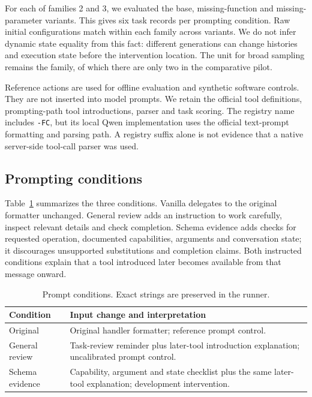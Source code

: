\documentclass[conference]{IEEEtran}
\newcommand{\code}[1]{\texttt{#1}}
\begin{document}
For each of families 2 and 3, we evaluated the base, missing-function and missing-parameter variants. This gives six task records per prompting condition. Raw initial configurations match within each family across variants. We do not infer dynamic state equality from this fact: different generations can change histories and execution state before the intervention location. The unit for broad sampling remains the family, of which there are only two in the comparative pilot.

Reference actions are used for offline evaluation and synthetic software controls. They are not inserted into model prompts. We retain the official tool definitions, prompting-path tool introductions, parser and task scoring. The registry name includes \code{-FC}, but its local Qwen implementation uses the official text-prompt formatting and parsing path. A registry suffix alone is not evidence that a native server-side tool-call parser was used.

\subsection{Prompting conditions}
Table~\ref{tab:conditions} summarizes the three conditions. Vanilla delegates to the original formatter unchanged. General review adds an instruction to work carefully, inspect relevant details and check completion. Schema evidence adds checks for requested operation, documented capabilities, arguments and conversation state; it discourages unsupported substitutions and completion claims. Both instructed conditions explain that a tool introduced later becomes available from that message onward.

\begin{table}[t]
\caption{Prompt conditions. Exact strings are preserved in the runner.}
\label{tab:conditions}\centering\small
\begin{tabular}{p{}p{}}\toprule
Condition & Input change and interpretation\\\midrule
Original & Original handler formatter; reference prompt control.\\
General review & Task-review reminder plus later-tool introduction explanation; uncalibrated prompt control.\\
Schema evidence & Capability, argument and state checklist plus the same later-tool explanation; development intervention.\\\bottomrule
\end{tabular}
\end{table}
\end{document}
